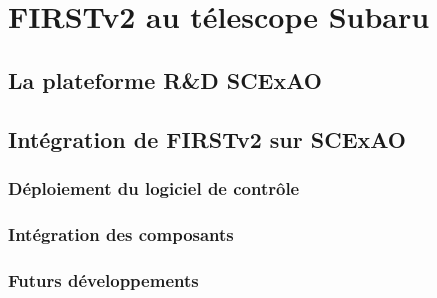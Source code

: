 \newpage\thispagestyle{empty}
\chapter{FIRSTv2 au télescope Subaru}
\label{sec:FIRSTv2Subaru}
\setcounter{figure}{0}
\setcounter{table}{0}
\setcounter{equation}{0}

\minitoc

\clearpage
\section{La plateforme R\&D SCExAO}

\section{Intégration de FIRSTv2 sur SCExAO}

\subsection{Déploiement du logiciel de contrôle}

\subsection{Intégration des composants}

\subsection{Futurs développements}


